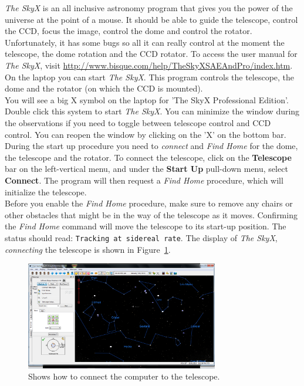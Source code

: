 \documentclass[12pt,twoside,a4paper]{report}
\begin{document}
\emph{The SkyX} is an all inclusive astronomy program that gives you the power of the 
universe at the point of a mouse. It should be able to guide the telescope, control the CCD, 
focus the image, control the dome and control the rotator. 
Unfortunately, it has some bugs so all it can really control at the moment the telescope, the 
dome rotation and the CCD rotator. To access the user manual for \emph{The SkyX}, 
visit \url{http://www.bisque.com/help/TheSkyXSAEAndPro/index.htm}.\\

On the laptop you can start \emph{The SkyX}. This program controls the telescope, the dome and the
rotator (on which the CCD is mounted).\\

You will see a big X symbol on the laptop for 'The SkyX Professional Edition'. Double click this
system to start \emph{The SkyX}. You can minimize the window during the observations if you need to 
toggle between telescope control and CCD control. You can reopen the window by clicking on the 'X' 
on the bottom bar.\\

During the start up procedure you need to \textit{connect} and \textit{Find Home} for the dome, 
the telescope and the rotator. To connect the telescope, click on the \textbf{Telescope} bar on the left-vertical menu, and 
under the \textbf{Start Up} pull-down menu, select \textbf{Connect}. The program will then request 
a \textit{Find Home} procedure, which will initialize the telescope.\\


Before you enable the \textit{Find Home} procedure, make sure to remove any chairs or other obstacles that might be in the
way of the telescope as it moves. Confirming the \textit{Find Home} command will move the telescope 
to its start-up position. The status should read: {\textcolor{PineGreen}{\tt Tracking at sidereal rate}}.
The display of \emph{The SkyX}, \textit{connecting} the telescope is shown in 
Figure~\ref{fig:connect_telescope}.\\

\begin{figure}[ht]
 \centering
    \includegraphics[width=0.75\textwidth]{documentation_images/connect_telescope.png}
    \caption{\label{fig:connect_telescope}Shows how to connect the computer to the telescope.}
\end{figure}
\end{document}
